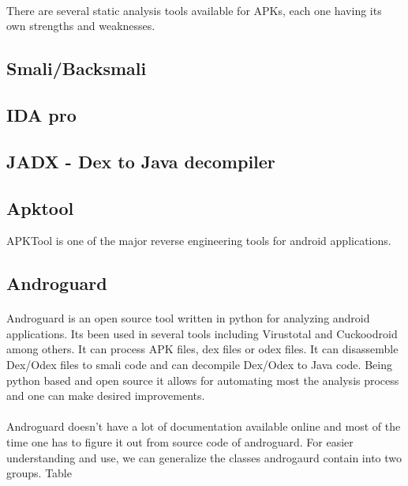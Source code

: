 \documentclass[../main.tex]{subfile}
\begin{document}
		\paragraph{} There are several static analysis tools available for APKs, each one having its own strengths and weaknesses.
		\subsection{Smali/Backsmali}
		\subsection{IDA pro}
		\subsection{JADX - Dex to Java decompiler}
		\subsection{Apktool}\label{sec:apktool}
		APKTool is one of the major reverse engineering tools for android applications.  
		\subsection{Androguard}\label{sec:androguard}
		\paragraph{} Androguard is an open source tool written in python for analyzing android applications. Its been used in several tools including Virustotal and Cuckoodroid among others. It can process APK files, dex files or odex files. It can disassemble Dex/Odex files to smali code and can decompile Dex/Odex to Java code. Being python based and open source it allows for automating most the analysis process and one can make desired improvements.
		\paragraph{} Androguard doesn't have a lot of documentation available online and most of the time one has to figure it out from source code of androguard. For easier understanding and use, we can generalize the classes androgaurd contain into two groups. Table
		
\end{document}
